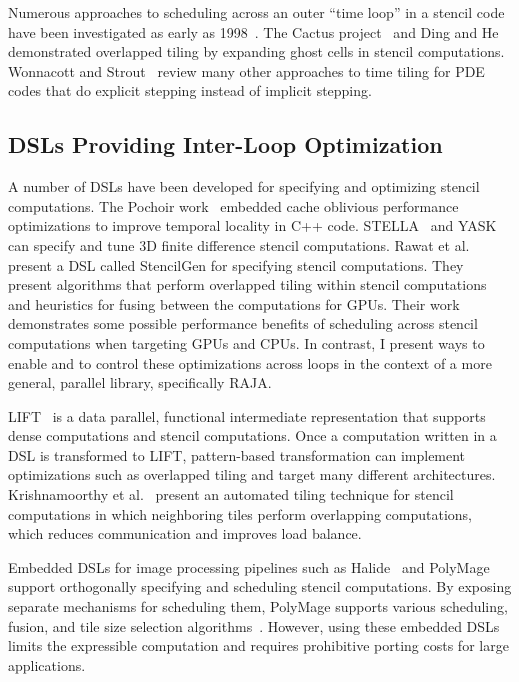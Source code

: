 Numerous approaches to scheduling across an outer ``time loop'' in a stencil
code have been investigated as early as 1998~\cite{Bassetti98,Wonnacott00}.  
The Cactus project~\cite{Ripeanu2001,Allen00cactus-gtoolkit} and 
Ding and He~\cite{Ding2001} demonstrated  overlapped tiling by expanding
ghost cells in stencil computations. 
Wonnacott and Strout~\cite{Wonnacott13} review many other approaches to
time tiling for PDE codes that do explicit stepping instead of implicit stepping.

\subsection{DSLs Providing Inter-Loop Optimization}
A number of DSLs have been developed for specifying and
optimizing stencil computations.
The Pochoir work~\cite{Tang2011} embedded cache oblivious performance
optimizations to improve temporal locality in C++ code.
STELLA~\cite{Gysi2015}  and YASK~\cite{YASK2016} can specify and 
tune 3D finite difference stencil computations.
Rawat et al.~\cite{Rawat18} present a DSL called StencilGen for specifying
stencil computations.
They present algorithms that perform overlapped tiling within stencil
computations and heuristics for fusing between the computations for GPUs.
Their work demonstrates some possible performance benefits of scheduling
across stencil computations when targeting GPUs and CPUs. In contrast,
I present ways to enable and to control these optimizations across loops
in the context of a more general, parallel library, specifically RAJA\@.

LIFT~\cite{Hagedorn2018} is a data parallel, functional intermediate
representation that supports dense computations and stencil computations.
Once a computation written in a DSL is transformed to LIFT, pattern-based
transformation can implement optimizations such as overlapped tiling and
target many different architectures.
Krishnamoorthy et al.~\cite{krishnamoorthy2007effective} present an automated tiling
technique for stencil computations in which neighboring tiles perform
overlapping computations, which reduces communication and improves load
balance.

Embedded DSLs for image processing pipelines such as
Halide~\cite{ragan-kelley2013halide} and
PolyMage~\cite{mullapudi2015polymage} support orthogonally specifying and
scheduling stencil computations.
By exposing separate mechanisms for scheduling them, PolyMage supports
various scheduling, fusion, and tile size selection
algorithms~\cite{Mullapudi2016,Jangda2018,Adams2019}.
However, using these embedded DSLs limits the expressible computation and requires prohibitive porting costs for large applications.

